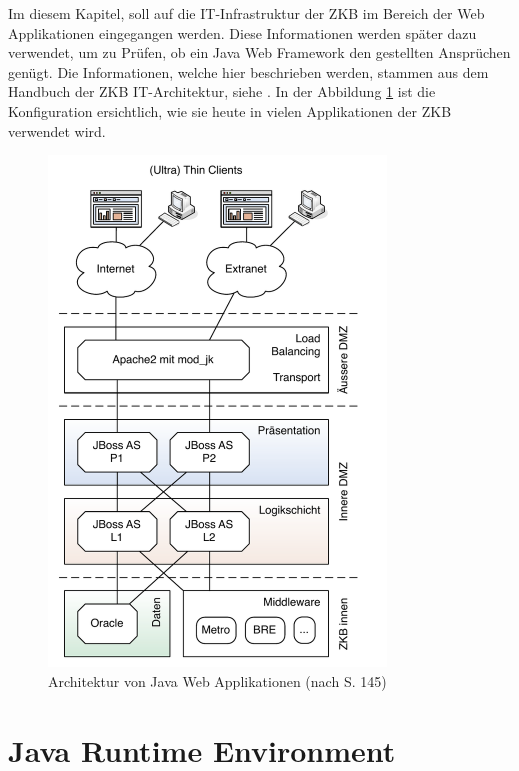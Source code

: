   Im diesem Kapitel, soll auf die IT-Infrastruktur der \ac{ZKB} im Bereich der
  Web Applikationen eingegangen werden. Diese Informationen werden später dazu
  verwendet, um zu Prüfen, ob ein Java Web Framework den gestellten Ansprüchen
  genügt. Die Informationen, welche hier beschrieben werden, stammen aus dem
  Handbuch der ZKB IT-Architektur, siehe \cite{ZkbHandbuchDerItArchitektur}. In
  der Abbildung \ref{img:infrastrukturZkb} ist die Konfiguration ersichtlich,
  wie sie heute in vielen Applikationen der \ac{ZKB} verwendet wird.
  
  \begin{figure}[hbtp]
    \begin{center}
      \includegraphics[width=0.80\textwidth]{./image/infrastrukturZkb.pdf}
      \caption{Architektur von Java Web Applikationen (nach
      \cite{ZkbHandbuchDerItArchitektur} S. 145)}
      \label{img:infrastrukturZkb}
    \end{center}
  \end{figure}
  
  \section{Java Runtime Environment}
  
